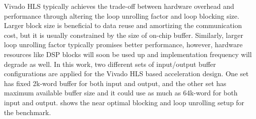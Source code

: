 Vivado HLS typically achieves the trade-off between hardware overhead and performance through altering the loop unrolling factor and loop blocking size. Larger block size is beneficial to data reuse and amortizing the communication cost, but it is usually constrained by the size of on-chip buffer. Similarly, larger loop unrolling factor typically promises better performance, however, hardware resources like DSP blocks will soon be used up and implementation frequency will degrade as well. In this work, two different sets of input/output buffer configurations are applied for the Vivado HLS based acceleration design. One set has fixed 2k-word buffer for both input and output, and the other set has maximum available buffer size and it could use as much as 64k-word for both input and output.  shows the near optimal blocking and loop unrolling setup for the benchmark. 

